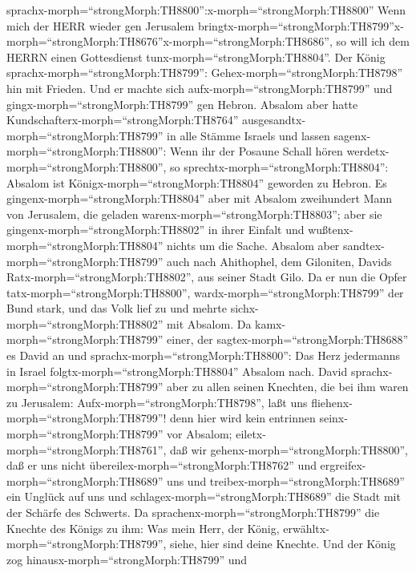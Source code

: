sprachx-morph=``strongMorph:TH8800'':x-morph=``strongMorph:TH8800'' Wenn
mich der HERR wieder gen Jerusalem
bringtx-morph=``strongMorph:TH8799''\textbar x-morph=``strongMorph:TH8676''x-morph=``strongMorph:TH8686'',
so will ich dem HERRN einen Gottesdienst
tunx-morph=``strongMorph:TH8804''.  Der König
sprachx-morph=``strongMorph:TH8799'': Gehex-morph=``strongMorph:TH8798''
hin mit Frieden. Und er machte sich aufx-morph=``strongMorph:TH8799''
und gingx-morph=``strongMorph:TH8799'' gen Hebron.  Absalom
aber hatte Kundschafterx-morph=``strongMorph:TH8764''
ausgesandtx-morph=``strongMorph:TH8799'' in alle Stämme Israels und
lassen sagenx-morph=``strongMorph:TH8800'': Wenn ihr der Posaune Schall
hören werdetx-morph=``strongMorph:TH8800'', so
sprechtx-morph=``strongMorph:TH8804'': Absalom ist
Königx-morph=``strongMorph:TH8804'' geworden zu Hebron.  Es
gingenx-morph=``strongMorph:TH8804'' aber mit Absalom zweihundert Mann
von Jerusalem, die geladen warenx-morph=``strongMorph:TH8803''; aber sie
gingenx-morph=``strongMorph:TH8802'' in ihrer Einfalt und
wußtenx-morph=``strongMorph:TH8804'' nichts um die Sache. 
Absalom aber sandtex-morph=``strongMorph:TH8799'' auch nach Ahithophel,
dem Giloniten, Davids Ratx-morph=``strongMorph:TH8802'', aus seiner
Stadt Gilo. Da er nun die Opfer tatx-morph=``strongMorph:TH8800'',
wardx-morph=``strongMorph:TH8799'' der Bund stark, und das Volk lief zu
und mehrte sichx-morph=``strongMorph:TH8802'' mit Absalom. 
Da kamx-morph=``strongMorph:TH8799'' einer, der
sagtex-morph=``strongMorph:TH8688'' es David an und
sprachx-morph=``strongMorph:TH8800'': Das Herz jedermanns in Israel
folgtx-morph=``strongMorph:TH8804'' Absalom nach.  David
sprachx-morph=``strongMorph:TH8799'' aber zu allen seinen Knechten, die
bei ihm waren zu Jerusalem: Aufx-morph=``strongMorph:TH8798'', laßt uns
fliehenx-morph=``strongMorph:TH8799''! denn hier wird kein entrinnen
seinx-morph=``strongMorph:TH8799'' vor Absalom;
eiletx-morph=``strongMorph:TH8761'', daß wir
gehenx-morph=``strongMorph:TH8800'', daß er uns nicht
übereilex-morph=``strongMorph:TH8762'' und
ergreifex-morph=``strongMorph:TH8689'' uns und
treibex-morph=``strongMorph:TH8689'' ein Unglück auf uns und
schlagex-morph=``strongMorph:TH8689'' die Stadt mit der Schärfe des
Schwerts.  Da sprachenx-morph=``strongMorph:TH8799'' die
Knechte des Königs zu ihm: Was mein Herr, der König,
erwähltx-morph=``strongMorph:TH8799'', siehe, hier sind deine Knechte.
 Und der König zog hinausx-morph=``strongMorph:TH8799'' und
